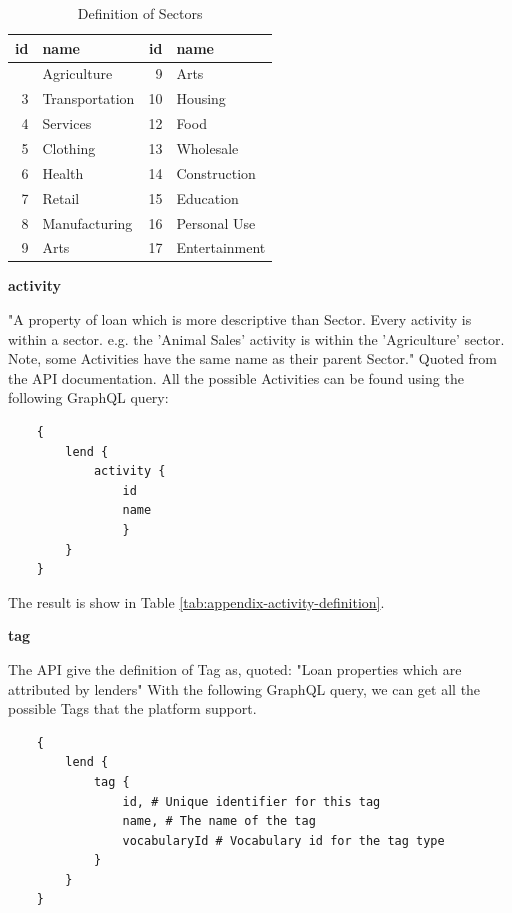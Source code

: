 \begin{longtable}[]{@{}rlrl@{}}
	\caption{Definition of Sectors}
	\label{tab:sector-definition}            \\
	\toprule\noalign{}
	id & name           & id & name          \\
	\midrule\noalign{}
	\endhead
	\bottomrule\noalign{}
	\endlastfoot
	1  & Agriculture    & 9  & Arts          \\
	3  & Transportation & 10 & Housing       \\
	4  & Services       & 12 & Food          \\
	5  & Clothing       & 13 & Wholesale     \\
	6  & Health         & 14 & Construction  \\
	7  & Retail         & 15 & Education     \\
	8  & Manufacturing  & 16 & Personal Use  \\
	9  & Arts           & 17 & Entertainment \\
\end{longtable}


\textbf{\Gls{activity}}

"A property of loan which is more descriptive than Sector.
Every activity is within a sector. e.g. the 'Animal Sales' activity is within the 'Agriculture' sector.
Note, some Activities have the same name as their parent Sector."
Quoted from the API documentation.
All the possible Activities can be found using the following GraphQL query:

\begin{lstlisting}
    {
        lend {
            activity {
                id
                name
                }	
        }
    }
\end{lstlisting}

The result is show in Table \ref{tab:appendix-activity-definition}.

\textbf{\Gls{tag}}

The API give the definition of Tag as,
quoted: "Loan properties which are attributed by lenders"
With the following GraphQL query, we can get all the possible Tags that the platform support.

\begin{lstlisting}
    {
        lend {
            tag {
                id, # Unique identifier for this tag
                name, # The name of the tag
                vocabularyId # Vocabulary id for the tag type
            }
        }
    }
\end{lstlisting}

